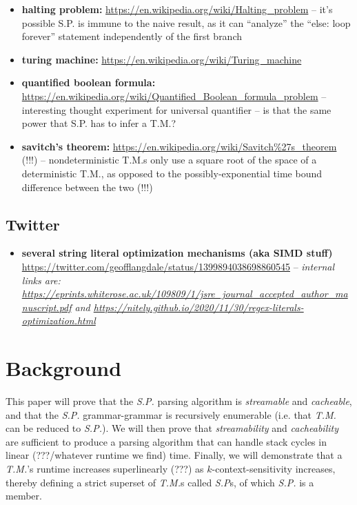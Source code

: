 \documentclass{article}
\begin{document}
\begin{itemize}
  \item \textbf{halting problem:} \url{https://en.wikipedia.org/wiki/Halting\_problem} -- it's possible S.P. is immune to the naive result, as it can ``analyze'' the ``else: loop forever'' statement independently of the first branch
  \item \textbf{turing machine:} \url{https://en.wikipedia.org/wiki/Turing\_machine}
  \item \textbf{quantified boolean formula:} \url{https://en.wikipedia.org/wiki/Quantified\_Boolean\_formula\_problem} -- interesting thought experiment for universal quantifier -- is that the same power that S.P. has to infer a T.M.?
  \item \textbf{savitch's theorem:} \url{https://en.wikipedia.org/wiki/Savitch\%27s\_theorem} (!!!) -- nondeterministic T.M.s only use a square root of the space of a deterministic T.M., as opposed to the possibly-exponential time bound difference between the two (!!!)
\end{itemize}

\subsection{Twitter}
\begin{itemize}
  \item \textbf{several string literal optimization mechanisms (aka SIMD stuff)} \url{https://twitter.com/geofflangdale/status/1399894038698860545} -- \textit{internal links are: \url{https://eprints.whiterose.ac.uk/109809/1/jsre_journal_accepted_author_manuscript.pdf} and \url{https://nitely.github.io/2020/11/30/regex-literals-optimization.html}}
\end{itemize}

\section{Background}
This paper will prove that the \textit{S.P.} parsing algorithm is \textit{streamable} and \textit{cacheable}, and that the \textit{S.P.} grammar-grammar is recursively enumerable (i.e. that \textit{T.M.} can be reduced to \textit{S.P.}). We will then prove that \textit{streamability} and \textit{cacheability} are sufficient to produce a parsing algorithm that can handle stack cycles in linear (???/whatever runtime we find) time. Finally, we will demonstrate that a \textit{T.M.}'s runtime increases superlinearly (???) as $k$-context-sensitivity increases, thereby defining a strict superset of \textit{T.M.}s called \textit{S.P}s, of which \textit{S.P.} is a member.
\end{document}

